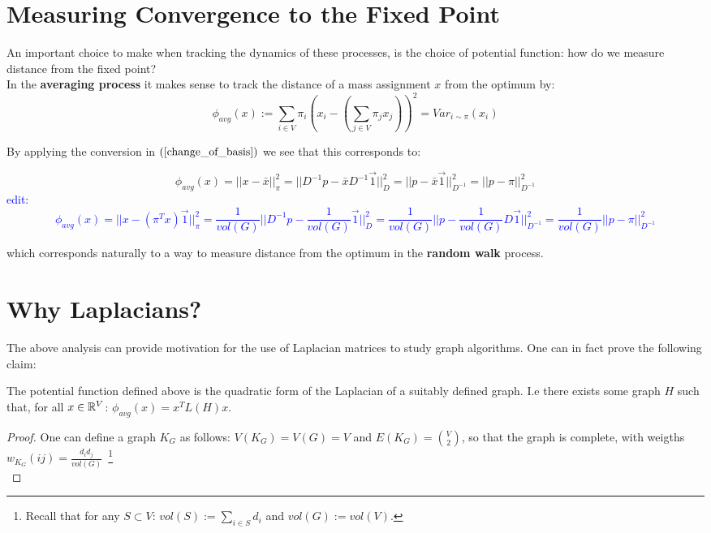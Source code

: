 \documentclass[11pt]{article}
\begin{document}
\section{Measuring Convergence to the Fixed Point}
An important choice to make when tracking the dynamics of these processes, is the choice of potential function: how do we measure distance from the fixed point?\\

\noindent
In the \textbf{averaging process} it makes sense to track the distance of a mass assignment $x$ from the optimum by:
\[
    \phi_{avg}(x):= \sum_{i\in V} \pi_i \left(x_i - (\sum_{j \in V} \pi_j x_j)\right)^2 = Var_{i \sim \pi}(x_i)
\]

\noindent
By applying the conversion in $(\ref{change_of_basis})$ we see that this corresponds to:

\[
    \phi_{avg}(x) = ||x - \bar{x}||_{\pi}^2 = ||D^{-1}p - \bar{x} D^{-1}\vec{1} ||^2_D = ||p - \bar{x}\vec{1}||^2_{D^{-1}} = ||p-\pi||^2_{D^{-1}}
\]
\textcolor{blue}{edit:
\[
    \phi_{avg}(x) = ||x - (\pi^T x)\vec{1}||_{\pi}^2 = \frac{1}{vol(G)}||D^{-1}p - \frac{1}{vol(G)}\vec{1} ||^2_D = \frac{1}{vol(G)}||p - \frac{1}{vol(G)}D\vec{1}||^2_{D^{-1}} = \frac{1}{vol(G)}||p-\pi||^2_{D^{-1}}
\]}

which corresponds naturally to a way to measure distance from the optimum in the \textbf{random walk} process.

\section{Why Laplacians?}
The above analysis can provide motivation for the use of Laplacian matrices to study graph algorithms. One can in fact prove the following claim:
\begin{claim}
The potential function defined above is the quadratic form of the Laplacian of a suitably defined graph. I.e there exists some graph $H$ such that, for all $x \in \mathbb{R}^V$:
$\phi_{avg}(x) = x^TL(H)x$.
\end{claim}
\begin{proof}
One can define a graph $K_G$ as follows: $V(K_G) = V(G)= V$ and $E(K_G) = \binom{V}{2}$, so that the graph is complete, with weigths $w_{K_G}(ij) = \frac{d_id_j}{vol(G)}$~\footnote[1]{Recall that for any $S \subset V$: $vol(S):= \sum_{i \in S} d_i$ and $vol(G):= vol(V)$.}\\

\end{proof}
\end{document}
